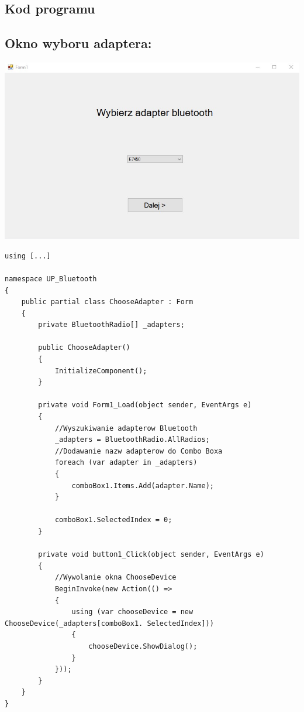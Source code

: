 \documentclass[12pt,a4paper,notitlepage]{report}
\begin{document}
\begin{adjustwidth}{0pt}{-50pt}
\section{Kod programu}
\subsection{Okno wyboru adaptera:}

\noindent \includegraphics[scale=0.7]{ChooseAdapter}
\begin{lstlisting}
using [...]

namespace UP_Bluetooth
{
    public partial class ChooseAdapter : Form
    {
        private BluetoothRadio[] _adapters;

        public ChooseAdapter()
        {
            InitializeComponent();
        }

        private void Form1_Load(object sender, EventArgs e)
        {
            //Wyszukiwanie adapterow Bluetooth
            _adapters = BluetoothRadio.AllRadios;
            //Dodawanie nazw adapterow do Combo Boxa
            foreach (var adapter in _adapters)
            {
                comboBox1.Items.Add(adapter.Name);
            }

            comboBox1.SelectedIndex = 0;
        }

        private void button1_Click(object sender, EventArgs e)
        {
            //Wywolanie okna ChooseDevice
            BeginInvoke(new Action(() =>
            {
                using (var chooseDevice = new ChooseDevice(_adapters[comboBox1. SelectedIndex]))
                {
                    chooseDevice.ShowDialog();
                }
            }));
        }
    }
}


\end{lstlisting}
\end{adjustwidth}
\end{document}
